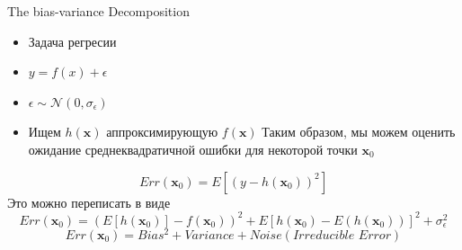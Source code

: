 \documentclass[10pt]{beamer}
\begin{document}
\begin{frame}{The bias-variance Decomposition}
\begin{itemize}
    \item Задача регресии
    \item $y=f(x) + \epsilon$
    \item $\epsilon \sim \mathcal{N}(0, \sigma_{\epsilon})$
    \item Ищем $h(\mathbf{x})$ аппроксимирующую $f(\mathbf{x})$
Таким образом, мы можем оценить ожидание среднеквадратичной ошибки для
некоторой точки $\mathbf{x}_0$
\end{itemize}
\[
    Err(\mathbf{x}_0) = E[(y - h(\mathbf{x}_0))^2]
\]
Это можно переписать в виде
\[
    Err(\mathbf{x}_0) = (E[h(\mathbf{x}_0)] - f(\mathbf{x}_0))^2 +
    E[h(\mathbf{x}_0) - E(h(\mathbf{x}_0))]^2 + \sigma_{\epsilon}^2
\]
\[
    Err(\mathbf{x}_0) = Bias^2 + Variance + Noise (Irreducible\,\, Error)
\]
\end{frame}
\end{document}

